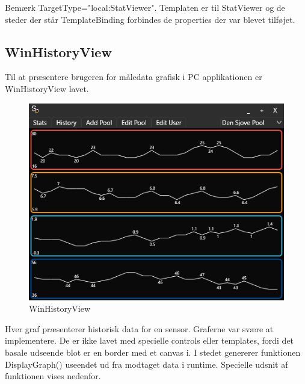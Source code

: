 Bemærk TargetType="local:StatViewer". Templaten er til StatViewer og de steder der står TemplateBinding forbindes de properties der var blevet tilføjet.

\subsection{WinHistoryView}
Til at præsentere brugeren for måledata grafisk i PC applikationen er WinHistoryView lavet.
\begin{figure}
\centering
\includegraphics[width=0.6\linewidth]{figs/implementering/winhistoryview}
\caption{WinHistoryView}
\label{fig:winhistoryview}
\end{figure}
Hver graf præsenterer historisk data for en sensor.
Graferne var svære at implementere. De er ikke lavet med specielle controls eller templates, fordi det basale udseende blot er en border med et canvas i. I stedet genererer funktionen DisplayGraph() useendet ud fra modtaget data i runtime. Specielle udsnit af funktionen vises nedenfor.

